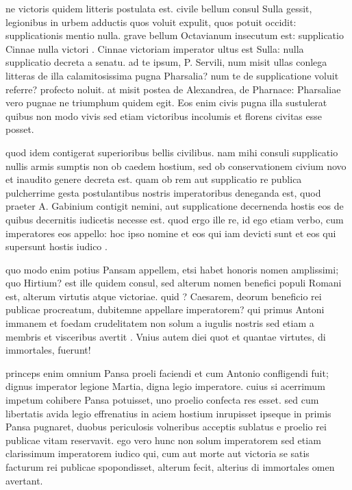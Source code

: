  ne victoris quidem litteris postulata est. civile bellum consul Sulla gessit, legionibus in urbem adductis quos voluit expulit, quos potuit occidit: supplicationis mentio nulla. grave bellum Octavianum insecutum est: supplicatio Cinnae nulla victori . Cinnae victoriam imperator ultus est Sulla: nulla supplicatio decreta a senatu. ad te ipsum, P. Servili, num misit ullas conlega litteras de illa calamitosissima pugna Pharsalia? num te de supplicatione voluit referre? profecto noluit. at misit postea de Alexandrea, de Pharnace: Pharsaliae vero pugnae ne triumphum quidem egit. Eos enim civis pugna illa sustulerat quibus non modo vivis sed etiam victoribus incolumis et florens civitas esse posset.

 quod idem contigerat superioribus bellis civilibus. nam mihi consuli supplicatio nullis armis sumptis non ob caedem hostium, sed ob conservationem civium novo et inaudito genere decreta est. quam ob rem aut supplicatio re publica pulcherrime gesta postulantibus nostris imperatoribus deneganda est, quod praeter A. Gabinium contigit nemini, aut supplicatione decernenda hostis eos de quibus decernitis iudicetis necesse est. quod ergo ille re, id ego etiam verbo, cum imperatores eos appello: hoc ipso nomine et eos qui iam devicti sunt et eos qui supersunt hostis iudico .

 quo modo enim potius Pansam appellem, etsi habet honoris nomen amplissimi; quo Hirtium? est ille quidem consul, sed alterum nomen benefici populi Romani est, alterum virtutis atque victoriae. quid ? Caesarem, deorum beneficio rei publicae procreatum, dubitemne appellare imperatorem? qui primus Antoni immanem et foedam crudelitatem non solum a iugulis nostris sed etiam a membris et visceribus avertit . Vnius autem diei quot et quantae virtutes, di immortales, fuerunt!

 princeps enim omnium Pansa proeli faciendi et cum Antonio confligendi fuit; dignus imperator legione Martia, digna legio imperatore. cuius si acerrimum impetum cohibere Pansa potuisset, uno proelio confecta res esset. sed cum libertatis avida legio effrenatius in aciem hostium inrupisset ipseque in primis Pansa pugnaret, duobus periculosis volneribus acceptis sublatus e proelio rei publicae vitam reservavit. ego vero hunc non solum imperatorem sed etiam clarissimum imperatorem iudico qui, cum aut morte aut victoria se satis facturum rei publicae spopondisset, alterum fecit, alterius di immortales omen avertant.

